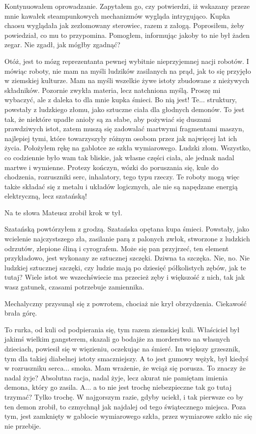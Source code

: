 Kontynuowałem oprowadzanie.
Zapytałem go, czy potwierdzi, iż wskazany przeze mnie kawałek steampunkowych mechanizmów wygląda intrygująco.
Kupka chaosu wyglądała jak zezłomowany sterowiec, razem z załogą.
Poprosiłem, żeby powiedział, co mu to przypomina. Pomogłem, informując jakoby to nie był żaden zegar.
Nie zgadł, jak mógłby zgadnąć?
\begin{dialogue}
\ds{} Otóż, jest to mózg reprezentanta pewnej wybitnie nieprzyjemnej nacji robotów.
I mówiąc roboty, nie mam na myśli ludzików zasilanych na prąd, jak to się przyjęło w ziemskiej kulturze.
Mam na myśli wszelkie żywe istoty zbudowane z nieżywych składników. Pozornie zwykła materia, lecz natchniona myślą.
\ds{} Proszę mi wybaczyć, ale z daleka to dla mnie kupka śmieci.
\ds{} Bo nią jest!
Te... struktury, powstały z ludzkiego złomu, jako sztuczne ciała dla głodnych demonów.
To jest tak, że niektóre upadłe anioły są za słabe, aby pożywiać się duszami prawdziwych istot, 
zatem muszą się zadowalać martwymi fragmentami maszyn, najlepiej tymi, które towarzyszyły różnym osobom przez jak najwięcej lat ich życia.
\dm{} Położyłem rękę na gablotce ze szkła wymiarowego. \dm{}
Ludzki złom. Wszystko, co codziennie było wam tak bliskie, jak własne części ciała, ale jednak nadal martwe i wymienne. 
Protezy kończyn, wózki do poruszania się, kule do chodzenia, rozruszniki serc, inhalatory, tego typu rzeczy.
Te roboty mogą więc także składać się z metalu i układów logicznych, ale nie są napędzane energią elektryczną, lecz szatańską!
\end{dialogue}
Na te słowa Mateusz zrobił krok w tył.
\begin{dialogue}
\ds{} Szatańską \dm{} powtórzyłem z grodzą. \dm{} Szatańska opętana kupa śmieci.
Powstały, jako wcielenie najczystszego zła, zasilanie parą z palonych zwłok, stworzone z ludzkich odrzutów, zlepione śliną i cyrografem.
Może się pan przyjrzeć, ten element przykładowo, jest wykonany ze sztucznej szczęki.
\ds{} Dziwna ta szczęka.
\ds{} Nie, no. Nie ludzkiej sztucznej szczęki, czy ludzie mają po dziesięć półkolistych zębów, jak te tutaj?
Wiele istot we wszechświecie ma przecież zęby i większość z nich, tak jak wasz gatunek, czasami potrzebuje zamiennika.
\end{dialogue}
Mechalyczny przysunął się z powrotem, chociaż nie krył obrzydzenia. Ciekawość brała górę.
\begin{dialogue}
\ds{} To rurka, od kuli od podpierania się, tym razem ziemskiej kuli. 
Właściciel był jakimś wielkim gangsterem, skazali go bodajże za morderstwo na własnych dzieciach, powiesił się w więzieniu, oczekując na śmierć.
Im większy grzesznik, tym dla takiej diabelnej istoty smaczniejszy.
A to jest gumowy wężyk, był kiedyś w rozruszniku serca... smoka.
\ds{} Mam wrażenie, że wciąż się porusza. To znaczy że nadal żyje?
\ds{} Absolutna racja, nadal żyje, lecz akurat nie pamiętam imienia demona, który go zasila.
\ds{} A... a to nie jest trochę niebezpieczne tak go tutaj trzymać?
\ds{} Tylko trochę. W najgorszym razie, gdyby uciekł, i tak pierwsze co by ten demon zrobił, to czmychnął jak najdalej od tego świątecznego miejsca. 
Poza tym, jest zamknięty w gablocie wymiarowego szkła, przez wymiarowe szkło nic się nie przebije.
\end{dialogue}

